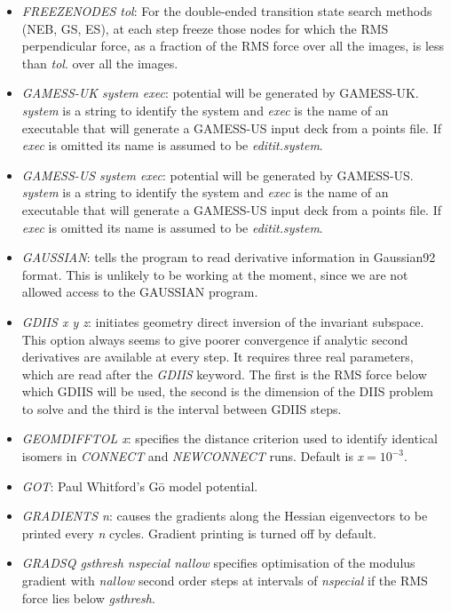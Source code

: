 \documentclass[12pt,a4paper,dvips]{article}
\begin{document}
\begin{itemize}
\item {\it FREEZENODES tol\/}: For the double-ended transition state search
  methods (NEB, GS, ES), at each step freeze those nodes for which the RMS
  perpendicular force, as a fraction of the RMS force over all the images, is
  less than {\it tol\/}.  over all the images.

\item {\it GAMESS-UK system exec\/}: potential will be generated by GAMESS-UK.
{\it system\/} is a string to identify the system and {\it exec\/} is
the name of an executable that will generate a GAMESS-US input deck from a points file.
If {\it exec\/} is omitted its name is assumed to be {\it editit.system}.
 
\item {\it GAMESS-US system exec\/}: potential will be generated by GAMESS-US.
{\it system\/} is a string to identify the system and {\it exec\/} is
the name of an executable that will generate a GAMESS-US input deck from a points file.
If {\it exec\/} is omitted its name is assumed to be {\it editit.system}.

\item {\it GAUSSIAN\/}: tells the program to read derivative information in
Gaussian92 format. This is unlikely to be working at the moment, since we 
are not allowed access to the GAUSSIAN program.

\item {\it GDIIS x y z\/}: initiates geometry direct inversion of the
invariant subspace. This option always seems to give poorer convergence
if analytic second derivatives are available at every step. It requires
three real parameters, which are read after the {\it GDIIS\/} keyword. The
first is the RMS force below which GDIIS will be used, the second is the 
dimension of the DIIS problem to solve and the third is the interval between
GDIIS steps. 

\item {\it GEOMDIFFTOL x\/}: specifies the distance criterion used to identify identical isomers
in {\it CONNECT\/} and {\it NEWCONNECT\/} runs. Default is {\it x}$=10^{-3}$.

\item {\it GOT\/}: Paul Whitford's G\={o} model potential.

\item {\it GRADIENTS n\/}: causes the gradients along the Hessian
eigenvectors to be printed every {\it n\/} cycles. Gradient printing is turned off by default.

\item {\it GRADSQ gsthresh nspecial nallow\/} specifies optimisation of the modulus gradient
with {\it nallow\/} second order steps at intervals of {\it nspecial\/} 
if the RMS force lies below {\it gsthresh\/}.


\end{itemize}
\end{document}
